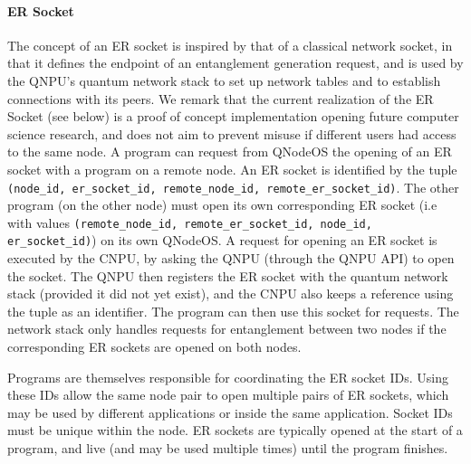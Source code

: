 \paragraph{ER Socket}
\label{qnodeos:sec:design_er_socket}
The concept of an \ac{ER} socket is inspired by that of a classical network socket, in that it defines the endpoint of an entanglement generation request, and is used by the \ac{QNPU}'s quantum network stack to set up network tables and to establish connections with its peers. 
We remark that the current realization of the \ac{ER} Socket (see below) is a proof of concept implementation opening future computer science research, and does not aim to prevent misuse if different users had access to the same node. 
A program can request from QNodeOS the opening of an \ac{ER} socket with a program on a remote node. An \ac{ER} socket is identified by the tuple \texttt{(node\_id, er\_socket\_id, remote\_node\_id, remote\_er\_socket\_id)}. The other program (on the other node) must open its own corresponding \ac{ER} socket (i.e with values \texttt{(remote\_node\_id, remote\_er\_socket\_id, node\_id, er\_socket\_id)}) on its own QNodeOS. A request for opening an \ac{ER} socket is executed by the CNPU, by asking the QNPU (through the QNPU API) to open the socket. The QNPU then registers the ER socket with the quantum network stack (provided it did not yet exist), and the CNPU also keeps a reference using the tuple as an identifier. The program can then use this socket for requests. The network stack only handles requests for entanglement between two nodes if the corresponding \ac{ER} sockets are opened on both nodes.

Programs are themselves responsible for coordinating the ER socket IDs. Using these IDs allow the same node pair to open multiple pairs of ER sockets, which may be used by different applications or inside the same application. Socket IDs must be unique within the node. \ac{ER} sockets are typically opened at the start of a program, and live (and may be used multiple times) until the program finishes.

